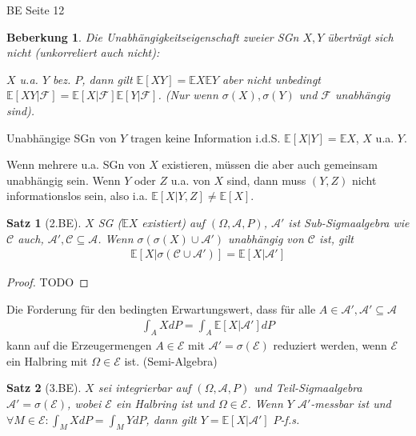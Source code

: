 \documentclass[]{article}
\newtheorem{theorem}{Satz}
\newtheorem*{remark}{Beberkung}
\begin{document}
BE Seite 12

\begin{remark}
	Die Unabhängigkeitseigenschaft zweier SGn $X, Y$ überträgt sich nicht (unkorreliert auch nicht):
	
	$X$ u.a. $Y$ bez. $P$, dann gilt $\mathbb{E}[XY]=\mathbb{E}X\mathbb{E}Y$ aber nicht unbedingt $\mathbb{E}[XY|\mathcal{F}]=\mathbb{E}[X|\mathcal{F}]\mathbb{E}[Y|\mathcal{F}]$. (Nur wenn $\sigma(X), \sigma(Y)$ und $\mathcal{F}$ unabhängig sind).
\end{remark}

Unabhängige SGn von $Y$ tragen keine Information i.d.S. $\mathbb{E}[X|Y]=\mathbb{E}X$, $X$ u.a. $Y$.

Wenn mehrere u.a. SGn von $X$ existieren, müssen die aber auch gemeinsam unabhängig sein. Wenn $Y$ oder $Z$ u.a. von $X$ sind, dann muss $(Y,Z)$ nicht informationslos sein, also i.a. $\mathbb{E}[X|Y,Z]\neq \mathbb{E}[X]$.

\begin{theorem}[2.BE]
	$X$ SG ($\mathbb{E}X$ existiert) auf $(\Omega, \mathcal{A}, P)$, $\mathcal{A}'$ ist Sub-Sigmaalgebra wie $\mathcal{C}$ auch, $\mathcal{A}', \mathcal{C} \subseteq \mathcal{A}$. Wenn $\sigma(\sigma(X)\cup \mathcal{A}')$ unabhängig von $\mathcal{C}$ ist, gilt
	\begin{align*}
		\mathbb{E}[X|\sigma(\mathcal{C}\cup \mathcal{A}')] = \mathbb{E}[X|\mathcal{A}']
	\end{align*}
\end{theorem}

\begin{proof}
	TODO
\end{proof}

Die Forderung für den bedingten Erwartungswert, dass für alle $A\in \mathcal{A}', \mathcal{A}'\subseteq\mathcal{A}$
\begin{align*}
	\int_A X dP = \int_A \mathbb{E}[X|\mathcal{A}'] dP
\end{align*}
kann auf die Erzeugermengen $A\in \mathcal{E}$ mit $\mathcal{A}' = \sigma(\mathcal{E})$ reduziert werden, wenn $\mathcal{E}$ ein Halbring mit $\Omega \in \mathcal{E}$ ist. (Semi-Algebra)

\begin{theorem}[3.BE]
	$X$ sei integrierbar auf $(\Omega, \mathcal{A}, P)$ und Teil-Sigmaalgebra $\mathcal{A}' = \sigma(\mathcal{E})$, wobei $\mathcal{E}$ ein Halbring ist und $\Omega \in \mathcal{E}$. Wenn $Y$ $\mathcal{A}'$-messbar ist und $\forall M \in \mathcal{E}: \int_M X dP = \int_M Y dP$, dann gilt $Y=\mathbb{E}[X|\mathcal{A}']$ $P$-f.s.
\end{theorem}
\end{document}

